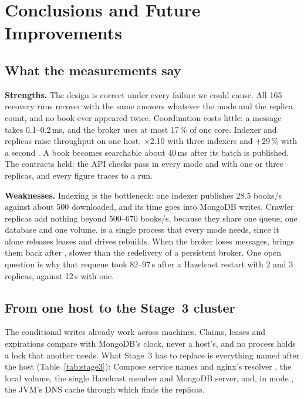 \section{Conclusions and Future Improvements}
\label{sec:conclusions}

\subsection{What the measurements say}

\textbf{Strengths.} The design is correct under every failure we could cause. All 165 recovery runs recover with the
same answers whatever the mode and the replica count, and no book ever appeared twice. Coordination costs little: a
message takes 0.1--0.2\,ms, and the broker uses at most 17\,\% of one core. Indexer and  replicas raise
throughput on one host, $\times$2.10 with three indexers and +29\,\% with a second . A book becomes
searchable about 40\,ms after its batch is published. The contracts held: the API checks pass in every mode and
with one or three  replicas, and every figure traces to a run.

\textbf{Weaknesses.} Indexing is the bottleneck: one indexer publishes 28.5 books/s against about 500 downloaded, and
its time goes into MongoDB writes. Crawler replicas add nothing beyond 500--670 books/s, because they share one queue,
one database and one volume.  is a single process that every mode needs, since it alone releases leases
and drives rebuilds. When the broker loses messages,  brings them back after
, slower than the redelivery of a persistent broker. One open question is why that
requeue took 82--97\,s after a Hazelcast restart with 2 and 3 replicas, against 12\,s with one.

\subsection{From one host to the Stage~3 cluster}
\label{sec:stage3}

The conditional writes already work across machines. Claims, leases and expirations compare with MongoDB's clock,
never a host's, and no process holds a lock that another needs. What Stage~3 has to replace is everything named after
the host (Table~\ref{tab:stage3}): Compose service names and nginx's resolver , the local
 volume, the single Hazelcast member and MongoDB server, and, in mode , the JVM's DNS
cache through which  finds the  replicas.

